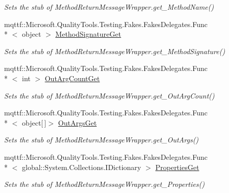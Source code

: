 \begin{DoxyCompactItemize}
\begin{DoxyCompactList}\small\item\em Sets the stub of Method\-Return\-Message\-Wrapper.\-get\-\_\-\-Method\-Name()\end{DoxyCompactList}\item 
mqttf\-::\-Microsoft.\-Quality\-Tools.\-Testing.\-Fakes.\-Fakes\-Delegates.\-Func\\*
$<$ object $>$ \hyperlink{class_system_1_1_runtime_1_1_remoting_1_1_messaging_1_1_fakes_1_1_stub_method_return_message_wrapper_a498dbbbcc7a9be0f18136d79dc1e66f9}{Method\-Signature\-Get}
\begin{DoxyCompactList}\small\item\em Sets the stub of Method\-Return\-Message\-Wrapper.\-get\-\_\-\-Method\-Signature()\end{DoxyCompactList}\item 
mqttf\-::\-Microsoft.\-Quality\-Tools.\-Testing.\-Fakes.\-Fakes\-Delegates.\-Func\\*
$<$ int $>$ \hyperlink{class_system_1_1_runtime_1_1_remoting_1_1_messaging_1_1_fakes_1_1_stub_method_return_message_wrapper_a0bb158bbb90fa162668f9def1186c846}{Out\-Arg\-Count\-Get}
\begin{DoxyCompactList}\small\item\em Sets the stub of Method\-Return\-Message\-Wrapper.\-get\-\_\-\-Out\-Arg\-Count()\end{DoxyCompactList}\item 
mqttf\-::\-Microsoft.\-Quality\-Tools.\-Testing.\-Fakes.\-Fakes\-Delegates.\-Func\\*
$<$ object\mbox{[}$\,$\mbox{]}$>$ \hyperlink{class_system_1_1_runtime_1_1_remoting_1_1_messaging_1_1_fakes_1_1_stub_method_return_message_wrapper_acb756d0840e7a58ca058945ee398751c}{Out\-Args\-Get}
\begin{DoxyCompactList}\small\item\em Sets the stub of Method\-Return\-Message\-Wrapper.\-get\-\_\-\-Out\-Args()\end{DoxyCompactList}\item 
mqttf\-::\-Microsoft.\-Quality\-Tools.\-Testing.\-Fakes.\-Fakes\-Delegates.\-Func\\*
$<$ global\-::\-System.\-Collections.\-I\-Dictionary $>$ \hyperlink{class_system_1_1_runtime_1_1_remoting_1_1_messaging_1_1_fakes_1_1_stub_method_return_message_wrapper_a0d0672e2737207eee9d0730ea7b7ac0d}{Properties\-Get}
\begin{DoxyCompactList}\small\item\em Sets the stub of Method\-Return\-Message\-Wrapper.\-get\-\_\-\-Properties()\end{DoxyCompactList}\item 

\end{DoxyCompactItemize}
